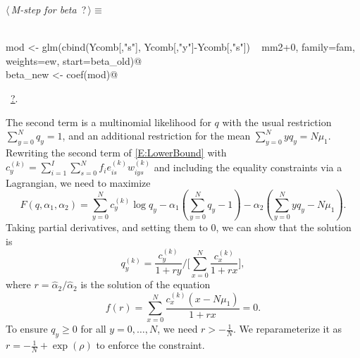 \documentclass[reqno]{amsart}
\renewcommand{\NWtarget}[2]{\hypertarget{#1}{#2}}
\renewcommand{\NWlink}[2]{\hyperlink{#1}{#2}}
\begin{document}
\begin{flushleft} \small\label{scrap11}\raggedright\small
\NWtarget{nuweb?}{} $\langle\,${\itshape M-step for beta}\nobreak\ {\footnotesize {?}}$\,\rangle\equiv$
\vspace{-1ex}
\begin{list}{}{} \item
\mbox{}\verb@@\\
\mbox{}\verb@    mod <- glm(cbind(Ycomb[,"s"], Ycomb[,"y"]-Ycomb[,"s"]) ~ mm2+0, family=fam, weights=ew, start=beta_old)@\\
\mbox{}\verb@    beta_new <- coef(mod)@\\
\mbox{}\verb@@{\NWsep}
\end{list}
\vspace{-1.5ex}
\footnotesize
\begin{list}{}{\setlength{\itemsep}{-\parsep}\setlength{\itemindent}{-\leftmargin}}
\item \NWtxtMacroRefIn\ \NWlink{nuweb?}{?}.

\item{}
\end{list}
\vspace{4ex}
\end{flushleft}
The second term is a multinomial likelihood for $q$ with the usual restriction  $\sum_{y=0}^N q_y=1$, and an additional restriction for the mean $\sum_{y=0}^{N}yq_y=N \mu_1$. Rewriting the second term of \eqref{E:LowerBound} with $c^{(k)}_y = \sum_{i=1}^I \sum_{s=0}^N f_i e_{is}^{(k)} w_{iys}^{(k)}$ and including the equality constraints via a Lagrangian, we need to maximize
\begin{equation*}
  F(q,\alpha_1,\alpha_2) = \sum_{y=0}^{N}c^{(k)}_y\log q_y - \alpha_1 (\sum_{y=0}^{N}q_y - 1) - \alpha_2 (\sum_{y=0}^{N}yq_y - N\mu_1).
\end{equation*}
Taking partial derivatives, and setting them to 0, we can show that the solution is
\begin{equation}\label{E:q_update}
  q^{(k)}_y = \frac{c^{(k)}_y}{1+r y} \Big/ \Big[ \sum_{x=0}^{N}\frac{c^{(k)}_x}{1+r x}\Big],
\end{equation}
where $r=\hat\alpha_2 / \hat\alpha_2$ is the solution of the equation
\begin{equation}\label{E:r_equation}
   f(r) = \sum_{x=0}^{N}\frac{c^{(k)}_x (x - N\mu_1)}{1+r x} = 0.
\end{equation}
To ensure $q_y\geq 0$ for all $y=0,\ldots,N$, we need $r> -\frac 1N$. We reparameterize it as $r=-\frac 1N+\exp(\rho)$ to enforce the constraint.
\end{document}

